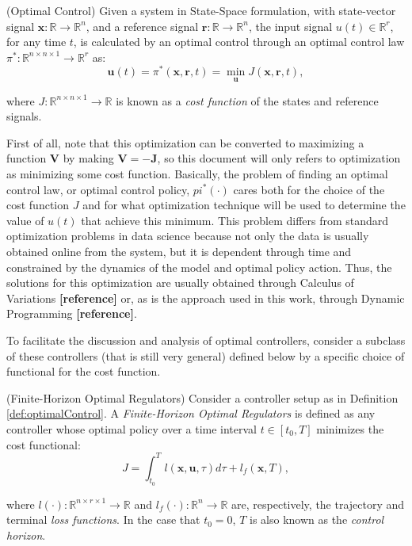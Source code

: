 \documentclass[a4paper,11pt]{book}
\numberwithin{figure}{chapter}
\numberwithin{equation}{chapter}
\numberwithin{table}{chapter}
\theoremstyle{definition}
\newtheorem{definition}{Definition}[chapter]
\newcounter{boxed-theorem}
\newcounter{boxed-definition}
\newenvironment{boxed-definition}[1]
{\colorlet{shadecolor}{pastelYellow!15} \begin{shaded} \begin{definition}{#1}}
{\end{definition} \end{shaded}}
\newcounter{boxed-example}
\begin{document}
\begin{boxed-definition}{(Optimal Control)} \label{def:optimalControl}
Given a system in State-Space formulation, with state-vector signal $\bm{x} : \mathbb{R} \rightarrow \mathbb{R}^{n}$, and a reference signal $\bm{r} : \mathbb{R} \rightarrow \mathbb{R}^{n}$, the input signal $u(t) \in \mathbb{R}^r$, for any time $t$, is calculated by an optimal control through an optimal control law $\pi^* : \mathbb{R}^{n \times n \times 1} \rightarrow \mathbb{R}^r$ as:
    \begin{equation}
        \bm{u}(t) = \pi^*(\bm{x}, \bm{r}, t) = \min_{\bm{u}} J(\bm{x}, \bm{r}, t)
    ,\end{equation}
    
\noindent where $J : \mathbb{R}^{n \times n \times 1} \rightarrow \mathbb{R}$ is known as a \textit{cost function} of the states and reference signals.
\end{boxed-definition}

First of all, note that this optimization can be converted to maximizing a function $\bm{V}$ by making $\bm{V} = -\bm{J}$, so this document will only refers to optimization as minimizing some cost function. Basically, the problem of finding an optimal control law, or optimal control policy, $pi^*(\cdot)$ cares both for the choice of the cost function $J$ and for what optimization technique will be used to determine the value of $u(t)$ that achieve this minimum. This problem differs from standard optimization problems in data science because not only the data is usually obtained online from the system, but it is dependent through time and constrained by the dynamics of the model and optimal policy action. Thus, the solutions for this optimization are usually obtained through Calculus of Variations \textbf{[reference]} or, as is the approach used in this work, through Dynamic Programming \textbf{[reference]}.

To facilitate the discussion and analysis of optimal controllers, consider a subclass of these controllers (that is still very general) defined below by a specific choice of functional for the cost function.

\begin{boxed-definition}{(Finite-Horizon Optimal Regulators)} \label{def:finiteHorizonOC}
    Consider a controller setup as in Definition \ref{def:optimalControl}. A \textit{Finite-Horizon Optimal Regulators} is defined as any controller whose optimal policy over a time interval $t \in [t_0, T]$ minimizes the cost functional:
    \begin{equation}
        J = \int_{t_0}^T l(\bm{x}, \bm{u}, \tau) d \tau + l_f(\bm{x}, T)
    ,\end{equation}
    
    \noindent where $l(\cdot) : \mathbb{R}^{n \times r \times 1} \rightarrow \mathbb{R}$ and $l_f(\cdot) : \mathbb{R}^{n} \rightarrow \mathbb{R}$ are, respectively, the trajectory and terminal \textit{loss functions}. In the case that $t_0 = 0$, $T$ is also known as the \textit{control horizon}.
\end{boxed-definition}
\end{document}
